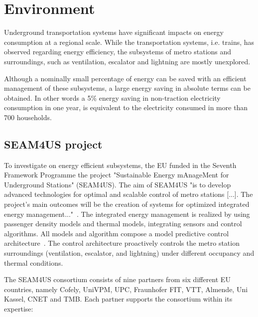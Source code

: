 \section{Environment}
\label{sec:environment}

Underground transportation systems have significant impacts on energy consumption at a regional scale. While the transportation systems, i.e. trains, has observed regarding energy efficiency, the subsystems of metro stations and surroundings, such as ventilation, escalator and lightning are mostly unexplored.

Although a nominally small percentage of energy can be saved with an efficient management of these subsystems, a large energy saving in absolute terms can be obtained. In other words a 5\% energy saving in non-traction electricity consumption in one year, is equivalent to the electricity consumed in more than 700 households. 


\subsection{SEAM4US project}
\label{subsec:seam4us}

To investigate on energy efficient subsystems, the EU funded in the Seventh Framework Programme the project "Sustainable Energy mAnageMent for Underground Stations" (SEAM4US).
The aim of SEAM4US "is to develop advanced technologies for optimal and scalable control of metro stations [...]. The project's main outcomes will be the creation of systems for optimized integrated energy management..."~\cite{SEAM4US_Website}.
The integrated energy management is realized by using passenger density models and thermal models, integrating sensors and control algorithms. All models and algorithm compose a model predictive control architecture~\cite{ansuini_models_2013}. The control architecture proactively controls the metro station surroundings (ventilation, escalator, and lightning) under different occupancy and thermal conditions.

The SEAM4US consortium consists of nine partners from six different EU countries, namely Cofely, UniVPM, UPC, Fraunhofer FIT, VTT, Almende, Uni Kassel, CNET and TMB. Each partner supports the consortium within its expertise:


